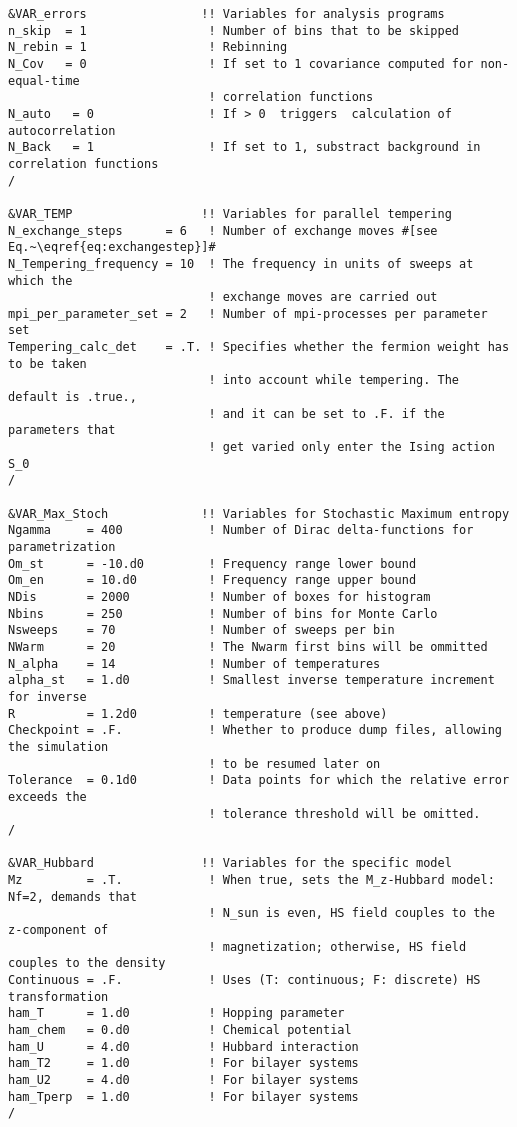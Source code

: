 \begin{lstlisting}[style=fortran,escapechar=\#,breaklines=true]
&VAR_errors                !! Variables for analysis programs
n_skip  = 1                 ! Number of bins that to be skipped
N_rebin = 1                 ! Rebinning  
N_Cov   = 0                 ! If set to 1 covariance computed for non-equal-time
                            ! correlation functions
N_auto   = 0                ! If > 0  triggers  calculation of autocorrelation 
N_Back   = 1                ! If set to 1, substract background in correlation functions
/  

&VAR_TEMP                  !! Variables for parallel tempering
N_exchange_steps      = 6   ! Number of exchange moves #[see Eq.~\eqref{eq:exchangestep}]#
N_Tempering_frequency = 10  ! The frequency in units of sweeps at which the
                            ! exchange moves are carried out
mpi_per_parameter_set = 2   ! Number of mpi-processes per parameter set
Tempering_calc_det    = .T. ! Specifies whether the fermion weight has to be taken
                            ! into account while tempering. The default is .true.,
                            ! and it can be set to .F. if the parameters that
                            ! get varied only enter the Ising action S_0
/

&VAR_Max_Stoch             !! Variables for Stochastic Maximum entropy
Ngamma     = 400            ! Number of Dirac delta-functions for parametrization
Om_st      = -10.d0         ! Frequency range lower bound
Om_en      = 10.d0          ! Frequency range upper bound
NDis       = 2000           ! Number of boxes for histogram
Nbins      = 250            ! Number of bins for Monte Carlo
Nsweeps    = 70             ! Number of sweeps per bin
NWarm      = 20             ! The Nwarm first bins will be ommitted
N_alpha    = 14             ! Number of temperatures
alpha_st   = 1.d0           ! Smallest inverse temperature increment for inverse
R          = 1.2d0          ! temperature (see above) 
Checkpoint = .F.            ! Whether to produce dump files, allowing the simulation
                            ! to be resumed later on
Tolerance  = 0.1d0          ! Data points for which the relative error exceeds the
                            ! tolerance threshold will be omitted.
/

&VAR_Hubbard               !! Variables for the specific model
Mz         = .T.            ! When true, sets the M_z-Hubbard model: Nf=2, demands that
                            ! N_sun is even, HS field couples to the z-component of
                            ! magnetization; otherwise, HS field couples to the density
Continuous = .F.            ! Uses (T: continuous; F: discrete) HS transformation
ham_T      = 1.d0           ! Hopping parameter
ham_chem   = 0.d0           ! Chemical potential
ham_U      = 4.d0           ! Hubbard interaction
ham_T2     = 1.d0           ! For bilayer systems
ham_U2     = 4.d0           ! For bilayer systems
ham_Tperp  = 1.d0           ! For bilayer systems
/
               
\end{lstlisting}
%
\FloatBarrier

